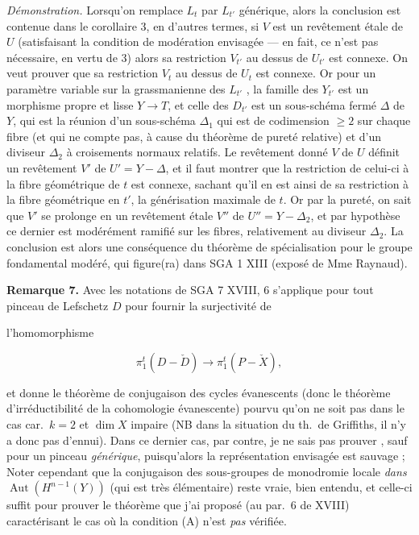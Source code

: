 \documentclass[11pt,a4paper]{article}
\begin{document}
\emph{Démonstration.} Lorsqu'on remplace $L_{t}$ par $L_{t'}$ générique, alors
la conclusion est contenue dans le corollaire 3, en d'autres termes, si $V$ est
un revêtement étale  de $U$ \struck{\ill{}} (satisfaisant la
condition de modération envisagée --- en fait, ce n'est pas nécessaire, en
vertu de 3) alors sa restriction $V_{t'}$ au dessus de $U_{t'}$ est connexe. On
veut prouver que sa restriction $V_{t}$ au dessus de $U_{t}$ est
 connexe. Or pour un paramètre variable sur la grassmanienne des
$L_{t'}$ ,
 la famille des $Y_{t'}$ est un morphisme
propre et lisse $Y \to T$, et celle des $D_{t'}$ est un sous-schéma fermé
\struck{\ill{}} $\Delta$ de $Y$, qui est la réunion d'un sous-schéma
$\Delta_{1}$ qui est de codimension $\geqslant 2$ sur chaque fibre (et qui ne
compte pas, à cause du théorème de pureté relative) et d'un diviseur
$\Delta_{2}$ à croisements normaux relatifs. Le revêtement donné $V$ de $U$
définit un revêtement \struck{\ill{}} $V'$ de $U' = Y - \Delta$, et il faut
montrer que la restriction de celui-ci à la fibre géométrique de $t$ est
connexe, sachant qu'il en est ainsi de sa restriction à la fibre géométrique en
$t'$, la générisation maximale de $t$. Or par la pureté, on sait que $V'$ se
prolonge en un revêtement étale $V''$ de $U'' = Y - \Delta_{2}$, et par
hypothèse ce dernier est modérément ramifié sur les fibres, relativement au
diviseur $\Delta_{2}$. La conclusion est alors une conséquence du théorème
\struck{\ill{}} de spécialisation pour le groupe fondamental modéré, qui
figure(ra) dans SGA 1 XIII (exposé de Mme Raynaud).

\textbf{Remarque 7.} Avec les notations de SGA 7 XVIII, 6 s'applique pour tout
pinceau de Lefschetz $D$ pour fournir la surjectivité de 


l'homomorphisme

\[ \pi_{1}^{t}(D - \check{D}) \longrightarrow \pi_{1}^{t}(P - \check{X}), \]

et donne le théorème de conjugaison des cycles évanescents (donc le théorème
d'irréductibilité de la cohomologie évanescente) pourvu qu'on ne soit pas dans
le cas car.\ $k = 2$ et $\dim X$ impaire (NB  dans la
situation du th.\ de Griffiths, il n'y a donc pas d'ennui). Dans ce dernier
cas, par contre, je ne sais \struck{\ill{}} pas prouver , sauf pour un pinceau \emph{générique},
puisqu'alors la représentation envisagée est sauvage ;  Noter cependant que la conjugaison
des sous-groupes de monodromie locale \emph{dans} $\operatorname{Aut}(H^{n-1}(Y))$
(qui est très élémentaire) reste vraie, bien entendu, et celle-ci suffit pour
prouver le théorème que j'ai proposé (au par.\ 6 de XVIII) caractérisant le cas
où la condition (A) n'est \emph{pas} vérifiée.
\end{document}
